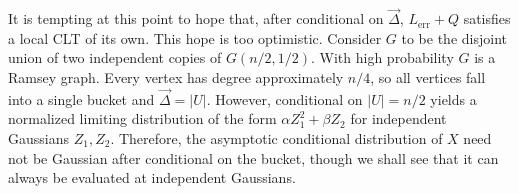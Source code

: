 
It is tempting at this point to hope that, after conditional on $\vec\Delta$, $L_{\text{err}} + Q$ satisfies a local CLT of its own. This hope is too optimistic. Consider $G$ to be the disjoint union of two independent copies of $G(n/2, 1/2)$. With high probability $G$ is a Ramsey graph. Every vertex has degree approximately $n/4$, so all vertices fall into a single bucket and $\vec\Delta = |U|$. However, conditional on $|U| = n/2$ yields a normalized limiting distribution of the form $\alpha Z_1^2 + \beta Z_2$ for independent Gaussians $Z_1, Z_2$. Therefore, the asymptotic conditional distribution of $X$ need not be Gaussian after conditional on the bucket, though we shall see that it can always be evaluated at independent Gaussians.


